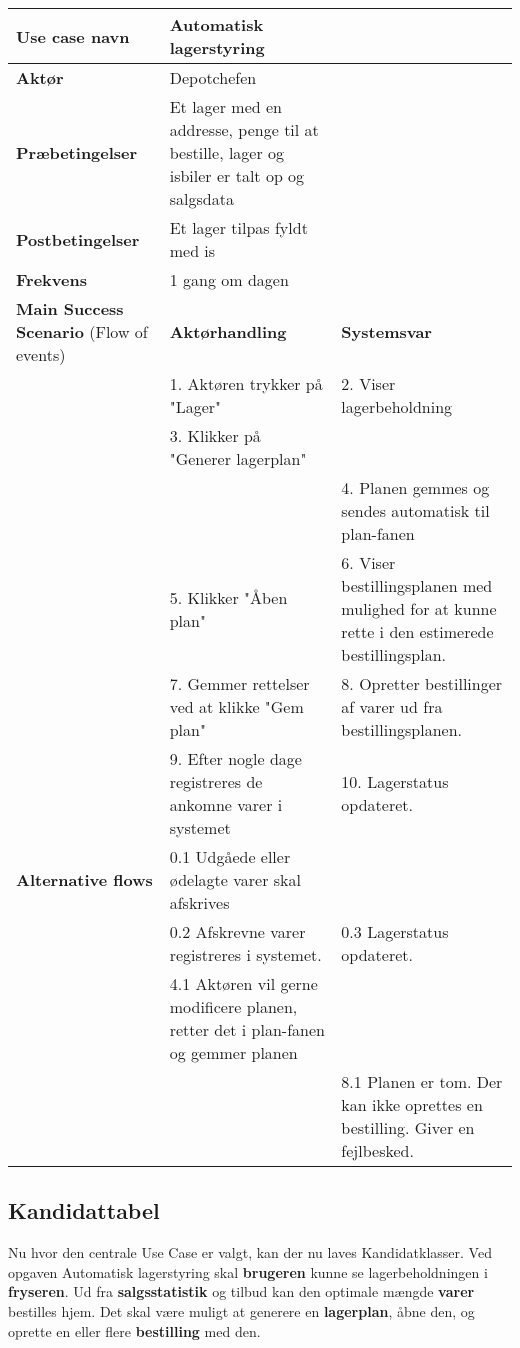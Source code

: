 \begin{longtable}{ |p{120pt}|p{120pt}|p{120pt}| }
    \hline
    \textbf{Use case navn} & Automatisk lagerstyring & \\
    \hline
    \textbf{Aktør} & Depotchefen & \\
    \hline
    \textbf{Præbetingelser} & Et lager med en addresse, penge til at bestille, lager og isbiler er talt op og salgsdata & \\
    \hline
    \textbf{Postbetingelser} & Et lager tilpas fyldt med is & \\
    \hline
    \textbf{Frekvens} & 1 gang om dagen & \\
    \hline
    \textbf{Main Success Scenario} (Flow of events) & \textbf{Aktørhandling} & \textbf{Systemsvar} \\
    \hline
    & 1. Aktøren trykker på "Lager" & 2. Viser lagerbeholdning \\
    \hline
    & 3. Klikker på "Generer lagerplan" &  \\
    & & 4. Planen gemmes og sendes automatisk til plan-fanen \\
    \hline
    & 5. Klikker "Åben plan" & 6. Viser bestillingsplanen med mulighed for at kunne rette i den estimerede bestillingsplan. \\
    \hline
    & 7. Gemmer rettelser ved at klikke "Gem plan" & 8. Opretter bestillinger af varer ud fra bestillingsplanen. \\
    \hline
    & 9. Efter nogle dage registreres de ankomne varer i systemet & 10. Lagerstatus opdateret. \\
    \hline
    \textbf{Alternative flows} & 0.1 Udgåede eller ødelagte varer skal afskrives & \\
    \hline
    & 0.2 Afskrevne varer registreres i systemet. & 0.3 Lagerstatus opdateret. \\
    \hline
    & 4.1 Aktøren vil gerne modificere planen, retter det i plan-fanen og gemmer planen & \\
    \hline
    & & 8.1 Planen er tom. Der kan ikke oprettes en bestilling. Giver en fejlbesked. \\
    \hline
\end{longtable}

\subsection{Kandidattabel}
Nu hvor den centrale Use Case er valgt, kan der nu laves Kandidatklasser. 
Ved opgaven Automatisk lagerstyring skal \textbf{brugeren} kunne se lagerbeholdningen i \textbf{fryseren}. Ud fra \textbf{salgsstatistik} og tilbud kan den optimale mængde \textbf{varer} bestilles hjem. Det skal være muligt at generere en \textbf{lagerplan}, åbne den, og oprette en eller flere \textbf{bestilling} med den.

